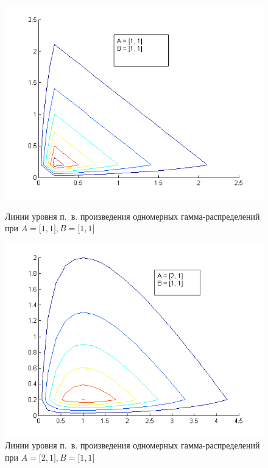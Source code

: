 \begin{figure}[h!]
  \begin{minipage}[h!]{0.47\linewidth}
    \includegraphics[width=1\linewidth]{pic/gamma_contour_1}
    \caption{Линии уровня п.~в. произведения одномерных гамма-распределений при
      $ A = \big[1, 1\big], B = \big[ 1, 1 \big] $}
    \label{pic:gamma_contour_start}
  \end{minipage}
  \hfill
  \begin{minipage}[h!]{0.47\linewidth}
    \includegraphics[width=1\linewidth]{pic/gamma_contour_2}
    \caption{Линии уровня п.~в. произведения одномерных гамма-распределений при
      $ A = \big[2, 1\big], B = \big[ 1, 1 \big] $}
  \end{minipage}
\end{figure}

